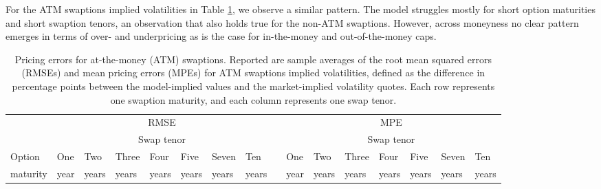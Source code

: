 \documentclass[11pt,a4paper,english,oneside]{book}
\numberwithin{equation}{chapter}
\begin{document}
For the ATM swaptions implied volatilities in Table \ref{Table3}, we observe a similar pattern. The model struggles mostly for short option maturities and short swaption tenors, an observation that also holds true for the non-ATM swaptions. However, across moneyness no clear pattern emerges in terms of over- and underpricing as is the case for in-the-money and out-of-the-money caps.



\begin{table}
	\caption[Pricing Errors for ATM Swaptions]{ Pricing errors for at-the-money (ATM) swaptions. \newline
		Reported are sample averages of the root mean squared errors (RMSEs) and mean pricing
		errors (MPEs) for ATM swaptions implied volatilities, defined as the difference in percentage points between the model-implied values and the market-implied volatility quotes. Each row represents one swaption maturity, and each column represents one swap tenor.}
	\label{Table3}
	\vspace{0.2cm}
	\setlength{\tabcolsep}{6pt}
	\begin{tabular}{lrrrrrrrlrrrrrrr}
		\toprule &
		\multicolumn{7}{c}{RMSE} &&
		\multicolumn{7}{c}{MPE} \\
		\cmidrule(l){2-9}  \cmidrule(l){10-16}
		& \multicolumn{7}{c}{Swap tenor} &&
		\multicolumn{7}{c}{Swap tenor} \\
		\cmidrule(l){2-9}  \cmidrule(l){10-16}
		\multicolumn{1}{l}{{Option}} & \multicolumn{1}{l}{One} & \multicolumn{1}{l}{Two} & \multicolumn{1}{l}{Three} & \multicolumn{1}{l}{Four} &
		\multicolumn{1}{l}{Five} & \multicolumn{1}{l}{Seven} & \multicolumn{1}{l}{Ten} & & \multicolumn{1}{l}{One} &  \multicolumn{1}{l}{Two} & \multicolumn{1}{l}{Three} & \multicolumn{1}{l}{Four} & \multicolumn{1}{l}{Five} & \multicolumn{1}{l}{Seven} & \multicolumn{1}{l}{Ten} \\
		
		\multicolumn{1}{l}{maturity} & \multicolumn{1}{l}{year} & \multicolumn{1}{l}{years} & \multicolumn{1}{l}{years} & \multicolumn{1}{l}{years} &
		\multicolumn{1}{l}{years} & \multicolumn{1}{l}{years} & \multicolumn{1}{l}{years} & & \multicolumn{1}{l}{year} &  \multicolumn{1}{l}{years} & \multicolumn{1}{l}{years} & \multicolumn{1}{l}{years} & \multicolumn{1}{l}{years} & \multicolumn{1}{l}{years} & \multicolumn{1}{l}{years} \\
		

\end{tabular}
\end{table}
\end{document}

